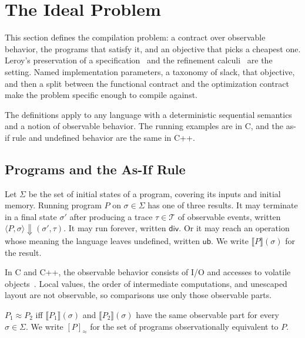 \section{The Ideal Problem}
\label{sec:ideal}

This section defines the compilation problem: a contract over observable
behavior, the programs that satisfy it, and an objective that picks a cheapest
one. Leroy's preservation of a
specification~\cite[\S2.1]{leroy2009backend} and the refinement
calculi~\cite{back1998refinement,morgan1994programming} are the setting. Named
implementation parameters, a taxonomy of slack, that objective, and then a
split between the functional contract and the optimization contract make the
problem specific enough to compile against.

The definitions apply to any language with a deterministic sequential semantics
and a notion of observable behavior. The running examples are in C, and the
as-if rule and undefined behavior are the same in C++.

\subsection{Programs and the As-If Rule}
\label{sec:setting}

Let \(\Sigma\) be the set of initial states of a program, covering its inputs
and initial memory. Running program \(P\) on \(\sigma \in \Sigma\) has one of
three results. It may terminate in a final state \(\sigma'\) after producing a
trace \(\tau \in \mathcal{T}\) of observable events, written
\(\langle P, \sigma \rangle \Downarrow (\sigma', \tau)\). It may run forever,
written \(\mathsf{div}\). Or it may reach an operation whose meaning the
language leaves undefined, written \(\mathsf{ub}\). We write
\(\llbracket P \rrbracket(\sigma)\) for the result.

In C and C++, the observable behavior consists of I/O and accesses to volatile
objects~\cite[\S4.1.2]{n4950}. Local values, the order of intermediate
computations, and unescaped layout are not observable, so comparisons use only
those observable parts.

\begin{definition}
\(P_1 \approx P_2\) iff \(\llbracket P_1 \rrbracket(\sigma)\) and
\(\llbracket P_2 \rrbracket(\sigma)\) have the same observable part for every
\(\sigma \in \Sigma\). We write \([P]_\approx\) for the set of programs
observationally equivalent to \(P\).
\end{definition}

